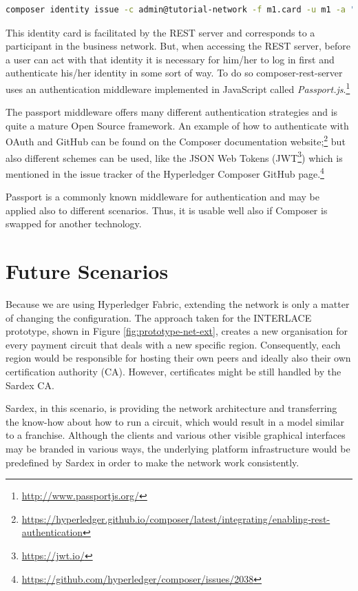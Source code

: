 \begin{lstlisting}[language=bash]
	composer identity issue -c admin@tutorial-network -f m1.card -u m1 -a "resource:net.sardex.interlace.Individual#m1" -x true 
\end{lstlisting}

This identity card is facilitated by the REST server and corresponds to a participant in the business network. 
But, when accessing the REST server, before a user can act with that identity it is necessary for him/her to log in first and authenticate his/her identity in some sort of way. To do so composer-rest-server uses an authentication middleware implemented in JavaScript called \textit{Passport.js}.\footnote{\url{http://www.passportjs.org/}}

The passport middleware offers many different authentication strategies and is quite a mature Open Source framework. An example of how to authenticate with OAuth and GitHub can be found on the Composer documentation website;\footnote{\url{https://hyperledger.github.io/composer/latest/integrating/enabling-rest-authentication}} but also different schemes can be used, like the JSON Web Tokens (JWT\footnote{\url{https://jwt.io/}}) which is mentioned in the issue tracker of the Hyperledger Composer GitHub page.\footnote{\url{https://github.com/hyperledger/composer/issues/2038}}

Passport is a commonly known middleware for authentication and may be applied also to different scenarios. Thus, it is usable well also if Composer is swapped for another technology.

\section{Future Scenarios}
\label{sec:future-scene}

Because we are using Hyperledger Fabric, extending the network is only a matter of changing the configuration. The approach taken for the INTERLACE prototype, shown in Figure \ref{fig:prototype-net-ext}, creates a new organisation for every payment circuit that deals with a new specific region. Consequently, each region would be responsible for hosting their own peers and ideally also their own certification authority (CA). However, certificates might be still handled by the Sardex CA. 

Sardex, in this scenario, is providing the network architecture and transferring the know-how about how to run a circuit, which would result in a model similar to a franchise. Although the clients and various other visible graphical interfaces may be branded in various ways, the underlying platform infrastructure would be predefined by Sardex in order to make the network work consistently.

